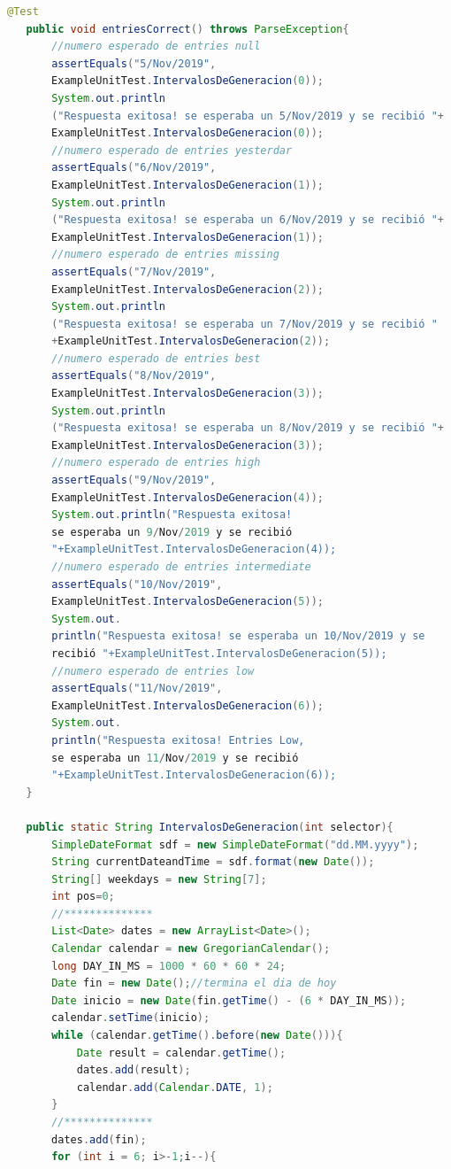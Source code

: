 \begin{lstlisting}[language= Java, frame=single]
   @Test
   public void entriesCorrect() throws ParseException{
       //numero esperado de entries null
       assertEquals("5/Nov/2019",
       ExampleUnitTest.IntervalosDeGeneracion(0));
       System.out.println
       ("Respuesta exitosa! se esperaba un 5/Nov/2019 y se recibió "+
       ExampleUnitTest.IntervalosDeGeneracion(0));
       //numero esperado de entries yesterdar
       assertEquals("6/Nov/2019", 
       ExampleUnitTest.IntervalosDeGeneracion(1));
       System.out.println
       ("Respuesta exitosa! se esperaba un 6/Nov/2019 y se recibió "+
       ExampleUnitTest.IntervalosDeGeneracion(1));
       //numero esperado de entries missing
       assertEquals("7/Nov/2019", 
       ExampleUnitTest.IntervalosDeGeneracion(2));
       System.out.println
       ("Respuesta exitosa! se esperaba un 7/Nov/2019 y se recibió "
       +ExampleUnitTest.IntervalosDeGeneracion(2));
       //numero esperado de entries best
       assertEquals("8/Nov/2019", 
       ExampleUnitTest.IntervalosDeGeneracion(3));
       System.out.println
       ("Respuesta exitosa! se esperaba un 8/Nov/2019 y se recibió "+
       ExampleUnitTest.IntervalosDeGeneracion(3));
       //numero esperado de entries high
       assertEquals("9/Nov/2019", 
       ExampleUnitTest.IntervalosDeGeneracion(4));
       System.out.println("Respuesta exitosa! 
       se esperaba un 9/Nov/2019 y se recibió 
       "+ExampleUnitTest.IntervalosDeGeneracion(4));
       //numero esperado de entries intermediate
       assertEquals("10/Nov/2019", 
       ExampleUnitTest.IntervalosDeGeneracion(5));
       System.out.
       println("Respuesta exitosa! se esperaba un 10/Nov/2019 y se 
       recibió "+ExampleUnitTest.IntervalosDeGeneracion(5));
       //numero esperado de entries low
       assertEquals("11/Nov/2019", 
       ExampleUnitTest.IntervalosDeGeneracion(6));
       System.out.
       println("Respuesta exitosa! Entries Low, 
       se esperaba un 11/Nov/2019 y se recibió 
       "+ExampleUnitTest.IntervalosDeGeneracion(6));
   }

   public static String IntervalosDeGeneracion(int selector){
       SimpleDateFormat sdf = new SimpleDateFormat("dd.MM.yyyy");
       String currentDateandTime = sdf.format(new Date());
       String[] weekdays = new String[7];
       int pos=0;
       //**************
       List<Date> dates = new ArrayList<Date>();
       Calendar calendar = new GregorianCalendar();
       long DAY_IN_MS = 1000 * 60 * 60 * 24;
       Date fin = new Date();//termina el dia de hoy
       Date inicio = new Date(fin.getTime() - (6 * DAY_IN_MS));
       calendar.setTime(inicio);
       while (calendar.getTime().before(new Date())){
           Date result = calendar.getTime();
           dates.add(result);
           calendar.add(Calendar.DATE, 1);
       }
       //**************
       dates.add(fin);
       for (int i = 6; i>-1;i--){


\end{lstlisting}
